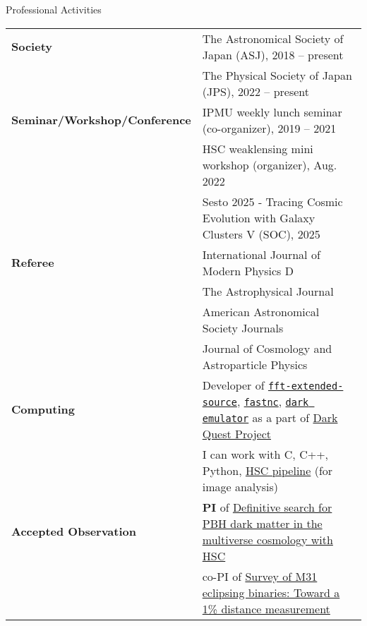 \begin{rSection}{Professional Activities}
    \begin{tabular}{ @{} >{\bfseries}l @{\hspace{6ex}} p{}}
    Society              & The Astronomical Society of Japan (ASJ), 2018 -- present \\
                         & The Physical Society of Japan (JPS), 2022 -- present  \\
    Seminar/Workshop/Conference     & IPMU weekly lunch seminar (co-organizer), 2019 -- 2021 \\
                         & HSC weaklensing mini workshop (organizer), Aug. 2022  \\
                         & Sesto 2025 - Tracing Cosmic Evolution with Galaxy Clusters V (SOC), 2025\\
    Referee              & International Journal of Modern Physics D \\
                         & The Astrophysical Journal \\
                         & American Astronomical Society Journals \\
                         & Journal of Cosmology and Astroparticle Physics \\
    Computing            & Developer of 
                           \href{https://github.com/git-sunao/fft-extended-source}{\tt fft-extended-source}, 
                           \href{https://github.com/git-sunao/fastnc}{\tt fastnc},
                           \href{https://dark-emulator.readthedocs.io/en/latest/}{\tt dark emulator} 
                           as a part of \href{https://darkquestcosmology.github.io}{Dark Quest Project} \\ 
                         & I can work with C, C++, Python, 
                           \href{https://hsc.mtk.nao.ac.jp/pipedoc/pipedoc_8_e/tutorial_e/index.html}{HSC pipeline} (for image analysis) \\
    Accepted Observation & {\textbf{PI}} of \href{https://subarutelescope.org/Observing/Schedule/S20B_abstract/S20B0032abst.html}{Definitive search for PBH dark matter in the multiverse cosmology with HSC} \\
                         & co-PI of \href{https://www.naoj.org/Observing/Schedule/s24b.html}{Survey of M31 eclipsing binaries: Toward a 1\% distance measurement}
    \end{tabular}
\end{rSection}

